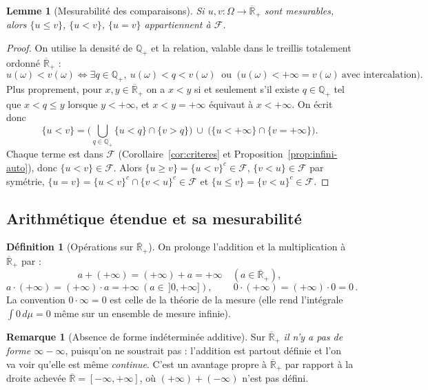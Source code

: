 \documentclass[11pt,a4paper]{article}
\theoremstyle{plain}
\newtheorem{lemma}[theorem]{Lemme}
\theoremstyle{definition}
\newtheorem{definition}[theorem]{Définition}
\newtheorem{remark}[theorem]{Remarque}
\newcommand{\Q}{\mathbb{Q}}
\newcommand{\Rpb}{\overline{\mathbb{R}}_+}
\newcommand{\Rb}{\overline{\mathbb{R}}}
\newcommand{\F}{\mathcal{F}}
\begin{document}
\begin{lemma}[Mesurabilité des comparaisons]\label{lem:comparaison}
Si $u,v:\Omega\to\Rpb$ sont mesurables, alors $\{u\le v\}$, $\{u<v\}$,
$\{u=v\}$ appartiennent à $\F$.
\end{lemma}

\begin{proof}
On utilise la densité de $\Q_+$ et la relation, valable dans le treillis
totalement ordonné $\Rpb$ :
\[
u(\omega)<v(\omega)\iff \exists q\in\Q_+,\ u(\omega)<q<v(\omega)\ \text{ ou }\ 
\big(u(\omega)<+\infty=v(\omega)\ \text{avec intercalation}\big).
\]
Plus proprement, pour $x,y\in\Rpb$ on a $x<y$ si et seulement s'il existe
$q\in\Q_+$ tel que $x<q\le y$ lorsque $y<+\infty$, et $x<y=+\infty$ équivaut à
$x<+\infty$. On écrit donc
\[
\{u<v\}=\Big(\bigcup_{q\in\Q_+}\{u<q\}\cap\{v>q\}\Big)\ \cup\ 
\big(\{u<+\infty\}\cap\{v=+\infty\}\big).
\]
Chaque terme est dans $\F$ (Corollaire~\ref{cor:criteres} et
Proposition~\ref{prop:infini-auto}), donc $\{u<v\}\in\F$. Alors
$\{u\ge v\}=\{u<v\}^c\in\F$, $\{v<u\}\in\F$ par symétrie,
$\{u=v\}=\{u<v\}^c\cap\{v<u\}^c\in\F$ et $\{u\le v\}=\{v<u\}^c\in\F$.
\end{proof}

\subsection{Arithmétique étendue et sa mesurabilité}

\begin{definition}[Opérations sur $\Rpb$]\label{def:arith}
On prolonge l'addition et la multiplication à $\Rpb$ par :
\[
a+(+\infty)=(+\infty)+a=+\infty\quad(a\in\Rpb),
\]
\[
a\cdot(+\infty)=(+\infty)\cdot a=+\infty\ (a\in\,]0,+\infty]),\qquad
\boxed{\,0\cdot(+\infty)=(+\infty)\cdot0=0\,.}
\]
La convention $0\cdot\infty=0$ est celle de la théorie de la mesure (elle rend
l'intégrale $\int 0\,d\mu=0$ même sur un ensemble de mesure infinie).
\end{definition}

\begin{remark}[Absence de forme indéterminée additive]
Sur $\Rpb$ \emph{il n'y a pas de forme $\infty-\infty$}, puisqu'on ne
soustrait pas : l'addition est partout définie et l'on va voir qu'elle est même
\emph{continue}. C'est un avantage propre à $\Rpb$ par rapport à la droite
achevée $\Rb=[-\infty,+\infty]$, où $(+\infty)+(-\infty)$ n'est pas défini.
\end{remark}
\end{document}

